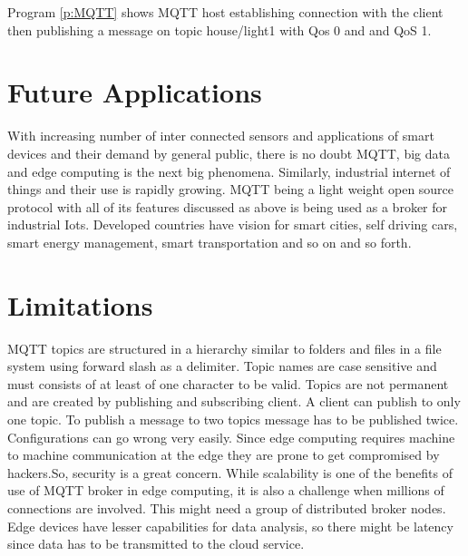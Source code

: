 \documentclass[sigconf]{acmart}
\begin{document}
Program \ref{p:MQTT} shows MQTT host establishing connection with the client then publishing a message on topic house/light1 with Qos 0 and and QoS 1.



\section{Future Applications}
With increasing number of inter connected sensors and applications of smart devices and their demand by general public, there is no doubt MQTT, big data and edge computing is the next big phenomena. Similarly, industrial internet of things and their use is rapidly growing. MQTT being a light weight open source protocol with all of its features discussed as above is being used as a broker for industrial Iots. Developed countries have vision for smart cities, self driving cars, smart energy management, smart transportation  and so on and so forth.    





\section{Limitations}

MQTT topics are structured in a hierarchy similar to folders and files in a file system using forward slash as a delimiter. Topic names are case sensitive and must consists of at least of one character to be valid.
Topics are not permanent and are created by publishing and subscribing client.
A client can publish to only one topic.
To publish a message to two topics message has to be published twice.
Configurations can go wrong very easily. Since edge computing requires machine to machine communication at the edge they are prone to get compromised by hackers.So, security is a great concern. While scalability is one of the benefits of use of MQTT broker in edge computing, it is also a challenge when millions of connections are involved. This might need a group of distributed broker nodes. Edge devices have lesser capabilities for data analysis, so there might be latency since data has to be transmitted to the cloud service. 
\end{document}
